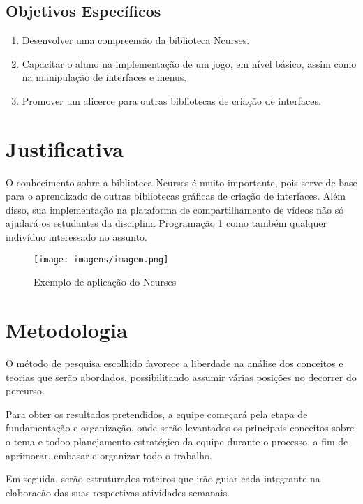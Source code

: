 \documentclass[a4paper,10pt]{article} %
\begin{document}
\subsection{Objetivos Específicos}


\begin{enumerate}
 \item Desenvolver uma compreensão da biblioteca Ncurses.
 \item Capacitar o aluno na implementação de um jogo, em nível básico, assim como na manipulação de interfaces e menus. 
 \item Promover um alicerce para outras bibliotecas de criação de interfaces.   
\end{enumerate}


\section{Justificativa}
O conhecimento sobre a biblioteca Ncurses é muito importante, pois serve de base para o aprendizado de outras bibliotecas gráficas de criação de interfaces. Além disso, sua implementação na plataforma de compartilhamento de vídeos não só ajudará os estudantes da disciplina Programação 1 como também qualquer indivíduo interessado no assunto.

\begin{figure}[ht] %
\centering
\texttt{[image: imagens/imagem.png]}
\caption{Exemplo de aplicação do Ncurses}
\label{fig:xsort}
\end{figure}


\section{Metodologia}

O método de pesquisa escolhido favorece a liberdade na análise dos conceitos e teorias que serão abordados, possibilitando assumir várias posições no decorrer do percurso.

Para obter os resultados pretendidos, a equipe começará pela etapa de fundamentação e organização, onde serão levantados os principais conceitos sobre o tema e todoo planejamento estratégico da equipe durante o processo, a fim de aprimorar, embasar e organizar todo o trabalho.

Em seguida, serão estruturados roteiros que irão guiar cada integrante na elaboracão das suas respectivas atividades semanais.
\end{document}
